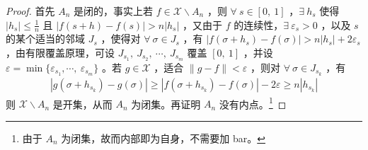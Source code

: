 \begin{enumerate}[leftmargin=2cm, label=\arabic*]
\begin{proof}
			首先 $A_n$ 是闭的，事实上若 $f\in \mathscr{X}\backslash A_n$ ，则 $\forall\ s\in[0,\ 1]$ ，$\exists\ h_s$ 使得 $|h_s|\leqslant \frac{1}{n}$ 且 $|f(s+h) - f(s)| > n|h_s|$ ，又由于 $f$ 的连续性，$\exists\ \varepsilon_s > 0$ ，以及 $s$ 的某个适当的邻域 $J_{s}$ ，使得对 $\forall\ \sigma\in J_s$ ，有 $|f(\sigma + h_s) - f(\sigma)| > n|h_s| + 2 \varepsilon_s$ ，由有限覆盖原理，可设 $J_{s_1},\ J_{s_2},\ \cdots,\ J_{s_m}$ 覆盖 $[0,\ 1]$ ，并设 $\varepsilon = \min\{\varepsilon_{s_1},\cdots,\ \varepsilon_{s_m}\}$ 。若 $g\in \mathscr{X}$ ，适合 $\|g-f\| < \varepsilon$ ，则对 $\forall\ \sigma\in J_{s_k}$ ，有
			\begin{align*}
				|g(\sigma+h_{s_k}) - g(\sigma)| \geqslant |f(\sigma + h_{s_k}) - f(\sigma)| - 2\varepsilon \geqslant n|h_{s_k}| 
			\end{align*}
			则 $\mathscr{X}\backslash A_n$ 是开集，从而 $A_n$ 为闭集。再证明 $A_n$ 没有内点。\footnote{由于 $A_n$ 为闭集，故而内部即为自身，不需要加 bar。}
			

\end{proof}
\end{enumerate}
